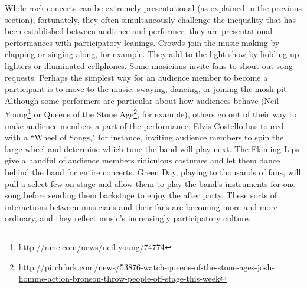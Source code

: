 While rock concerts can be extremely presentational (as explained in the previous section), fortunately, they often simultaneously challenge the inequality that has been established between audience and performer; they are presentational performances with participatory leanings. Crowds join the music making by clapping or singing along, for example. They add to the light show by holding up lighters or illuminated cellphones. Some musicians invite fans to shout out song requests. Perhaps the simplest way for an audience member to become a participant is to move to the music: swaying, dancing, or joining the mosh pit. Although some performers are particular about how audiences behave (Neil Young\footnote{\url{http://nme.com/news/neil-young/74774}} or Queens of the Stone Age\footnote{\url{http://pitchfork.com/news/53876-watch-queens-of-the-stone-ages-josh-homme-action-bronson-throw-people-off-stage-this-week}}, for example), others go out of their way to make audience members a part of the performance. Elvis Costello has toured with a ``Wheel of Songs," for instance, inviting audience members to spin the large wheel and determine which tune the band will play next. The Flaming Lips give a handful of audience members ridiculous costumes and let them dance behind the band for entire concerts. Green Day, playing to thousands of fans, will pull a select few on stage and allow them to play the band's instruments for one song before sending them backstage to enjoy the after party. These sorts of interactions between musicians and their fans are becoming more and more ordinary, and they reflect music's increasingly participatory culture.

